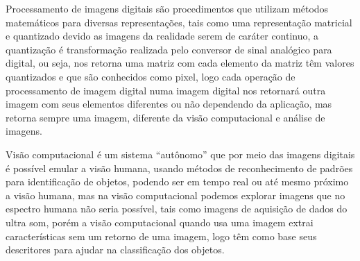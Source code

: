 \documentclass[12pt,a4paper]{article}
\begin{document}
\begin{solution}
    Processamento de imagens digitais são procedimentos que utilizam métodos
    matemáticos para diversas representações, tais como uma representação
    matricial e quantizado devido as imagens da realidade serem de caráter
    continuo, a quantização é transformação realizada pelo conversor de sinal
    analógico para digital, ou seja, nos retorna uma matriz com cada elemento da
    matriz têm valores quantizados e que são conhecidos como pixel, logo cada
    operação de processamento de imagem digital numa imagem digital nos
    retornará outra imagem com seus elementos diferentes ou não dependendo da
    aplicação, mas retorna sempre uma imagem, diferente da visão computacional e
    análise de imagens.

    Visão computacional é um sistema ``autônomo'' que por meio das imagens
    digitais é possível emular a visão humana, usando métodos de reconhecimento
    de padrões para identificação de objetos, podendo ser em tempo real ou até
    mesmo próximo a visão humana, mas na visão computacional podemos explorar
    imagens que no espectro humana não seria possível, tais como imagens de
    aquisição de dados do ultra som, porém a visão computacional quando usa uma
    imagem extrai características sem um retorno de uma imagem, logo têm como
    base seus descritores para ajudar na classificação dos objetos. 


\end{solution}
\end{document}
